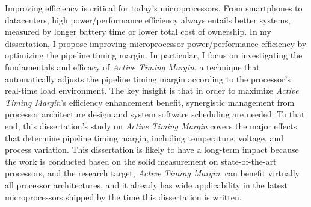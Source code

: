 
%
\utabstract
\indent

Improving efficiency is critical for today's microprocessors. From smartphones to datacenters, high power/performance efficiency always entails better systems, measured by longer battery time or lower total cost of ownership. In my dissertation, I propose improving microprocessor power/performance efficiency by optimizing the pipeline timing margin. In particular, I focus on investigating the fundamentals and efficacy of \textit{Active Timing Margin}, a technique that automatically adjusts the pipeline timing margin according to the processor's real-time load environment. The key insight is that in order to maximize \textit{Active Timing Margin}'s efficiency enhancement benefit, synergistic management from processor architecture design and system software scheduling are needed. To that end, this dissertation's study on \textit{Active Timing Margin} covers the major effects that determine pipeline timing margin, including temperature, voltage, and process variation. This dissertation is likely to have a long-term impact because the work is conducted based on the solid measurement on state-of-the-art processors, and the research target, \textit{Active Timing Margin}, can benefit virtually all processor architectures, and it already has wide applicability in the latest microprocessors shipped by the time this dissertation is written.




